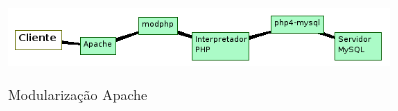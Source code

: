 \begin{figure}[H]
    \centering
    \caption{Modularização Apache}
    \includegraphics[width=0.9\textwidth]{./dados/figuras/fig12}
    \label{fig:modularizacaoApache}
\end{figure}


